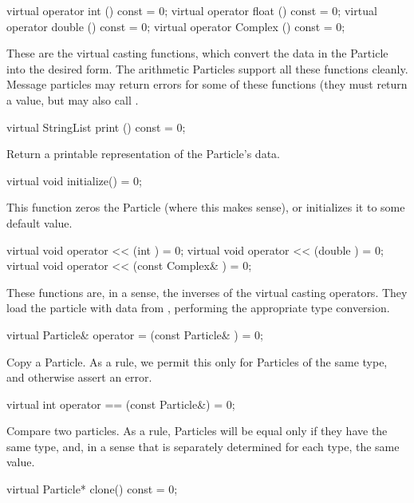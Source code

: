 \begin{example}
virtual operator int () const = 0;
virtual operator float () const = 0;
virtual operator double () const = 0;
virtual operator Complex () const = 0;
\end{example}

These are the virtual casting functions, which convert the data in
the Particle into the desired form.  The arithmetic Particles support
all these functions cleanly.  Message particles may return errors for
some of these functions (they must return a value, but may also call
.

\begin{example}
virtual StringList print () const = 0;
\end{example}

Return a printable representation of the Particle's data.

\begin{example}
virtual void initialize() = 0;
\end{example}

This function zeros the Particle (where this makes sense), or
initializes it to some default value.

\begin{example}
virtual void operator << (int ) = 0;
virtual void operator << (double ) = 0;
virtual void operator << (const Complex& ) = 0;
\end{example}

These functions are, in a sense, the inverses of the virtual casting
operators.  They load the particle with data from , performing
the appropriate type conversion.

\begin{example}
virtual Particle& operator = (const Particle& ) = 0;
\end{example}

Copy a Particle.  As a rule, we permit this only for Particles of the
same type, and otherwise assert an error.

\begin{example}
virtual int operator == (const Particle&) = 0;
\end{example}

Compare two particles.  As a rule, Particles will be equal only if
they have the same type, and, in a sense that is separately determined
for each type, the same value.

\begin{example}
virtual Particle* clone() const = 0;
\end{example}

